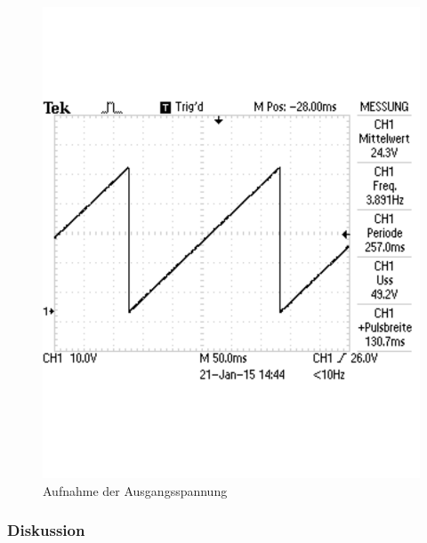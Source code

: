 \documentclass[12pt,a4paper]{article}
\begin{document}
\begin{figure}[H] 
  \centering 	
    \includegraphics[trim = 0mm 50mm 0mm 50mm, clip, scale = 0.4]{1_2_1.pdf}
  	\caption[Aufnahme der Ausgangsspannung]{Aufnahme der Ausgangsspannung} 
  \label{fig:1_2_1}
\end{figure}
 

\subsubsection*{Diskussion}
\end{document}
